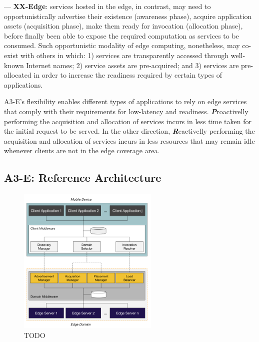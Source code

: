 --- \textbf{XX-Edge}: services hosted in the edge, in contrast, may need to opportunistically advertise their existence (awareness phase), acquire application assets (acquisition phase), make them ready for invocation (allocation phase), before finally been able to expose the required computation as services to be consumed. Such opportunistic modality of edge computing, nonetheless, may co-exist with others in which: 1) services are transparently accessed through well-known Internet names; 2) service assets are pre-acquired; and 3) services are pre-allocated in order to increase the readiness required by certain types of applications. 

A3-E's flexibility enables different types of applications to rely on edge services that comply with their requirements for low-latency and readiness. \textbf{\textit{P}}roactivelly performing the acquisition and allocation of services incurs in less time taken for the initial request to be served. In the other direction, \textbf{\textit{R}}eactivelly performing the acquisition and allocation of services incurs in less resources that may remain idle whenever clients are not in the edge coverage area. 

\subsection{A3-E: Reference Architecture}\label{sec:a3-e-reference-architecture}

\begin{figure}
  \includegraphics[width=0.6\textwidth]{figs/reference-architecture.png}
  \caption{TODO}
  \label{fig:reference-architecture}
\end{figure}

